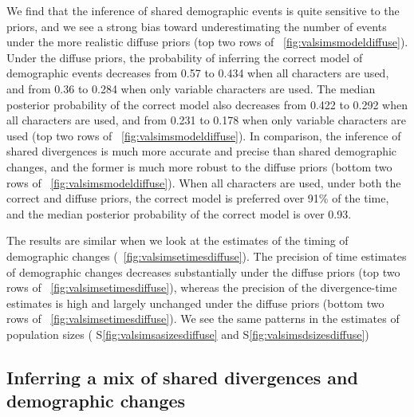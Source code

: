
We find that the inference of shared demographic events is quite sensitive to
the priors, and we see a strong bias toward underestimating the number of
events under the more realistic diffuse priors
(top two rows of \fig{}~\ref{fig:valsimsmodeldiffuse}).
Under the diffuse priors, the probability of inferring the correct model of
demographic events decreases from 0.57 to 0.434 when all characters are used,
and from 0.36 to 0.284 when only variable characters are used.
The median posterior probability of the correct model also decreases from
0.422 to 0.292 when all characters are used,
and from 0.231 to 0.178 when only variable characters are used
(top two rows of \fig{}~\ref{fig:valsimsmodeldiffuse}).
In comparison, the inference of shared divergences is much more
accurate and precise than shared demographic changes, and
the former is much more robust to the diffuse priors
(bottom two rows of \fig{}~\ref{fig:valsimsmodeldiffuse}).
When all characters are used, under both the correct and diffuse
priors, the correct model is preferred over 91\% of the time,
and the median posterior probability of the correct model is over
0.93.

\ifembed{

}{}

The results are similar when we look at the estimates of the timing of
demographic changes
(\fig{}~\ref{fig:valsimsetimesdiffuse}).
The precision of time estimates of demographic changes decreases
substantially under the diffuse priors
(top two rows of \fig{}~\ref{fig:valsimsetimesdiffuse}),
whereas the precision of the divergence-time estimates
is high and largely unchanged under the diffuse priors
(bottom two rows of \fig{}~\ref{fig:valsimsetimesdiffuse}).
We see the same patterns in the estimates of population sizes
(\figs
S\ref{fig:valsimsasizesdiffuse}
and
S\ref{fig:valsimsdsizesdiffuse})

\ifembed{

}{}


\subsection{Inferring a mix of shared divergences and demographic changes}

